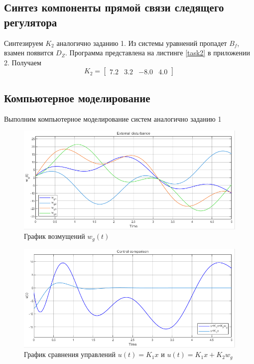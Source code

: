 \documentclass[a4paper, 12pt]{article}
\begin{document}
    \subsection{Синтез компоненты прямой связи следящего регулятора}
    Синтезируем $K_2$ аналогично заданию 1. Из системы уравнений пропадет $B_f$, взамен появится $D_Z$.
    Программа представлена на листинге \ref{task2} в приложении 2. Получаем
    $$
    K_2=\begin{bmatrix}
        7.2    &3.2  &-8.0  &4.0
    \end{bmatrix}
    $$


    \subsection{Компьютерное моделирование}
    Выполним компьютерное моделирование систем аналогично заданию 1
    \begin{figure}[H]
        \centering
        \includegraphics[scale=0.75]{2task_wg.png}
        \captionsetup{skip=0pt}
        \caption{График возмущений $ w_g(t)$}
        \label{fig:2task_wg}
    \end{figure}
    \begin{figure}[H]
        \centering
        \includegraphics[scale=0.75]{2task_uu.png}
        \captionsetup{skip=0pt}
        \caption{График сравнения управлений $u(t)=K_1x$ и $u(t)=K_1x+K_2 w_g$}
        \label{fig:2task_uu}
    \end{figure}
\end{document}

